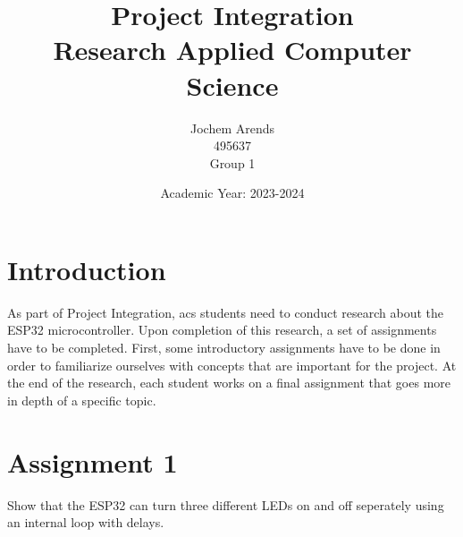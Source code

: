 \documentclass{article}
\title{Project Integration \\ Research Applied Computer Science}
\author{Jochem Arends \\ 495637 \\ Group 1}
\date{Academic Year: 2023-2024}
\begin{document}
\maketitle
\newpage

\tableofcontents
\newpage

\section{Introduction}
As part of Project Integration, \gls{acs} students need to conduct research about the ESP32 microcontroller.
Upon completion of this research, a set of assignments have to be completed.
First, some introductory assignments have to be done in order to familiarize ourselves with concepts that are important for the project.
At the end of the research, each student works on a final assignment that goes more in depth of a specific topic.

\section{Assignment 1}
Show that the ESP32 can turn three different LEDs on and off seperately using an internal loop with delays.



\end{document}
